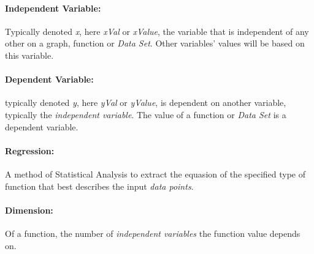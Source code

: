 \documentclass[main.tex]{subfiles}
\begin{document}
      \paragraph{Independent Variable:} Typically denoted \textit{x}, here \textit{xVal} or \textit{xValue}, the variable that is independent of any other on a graph, function or \textit{Data Set}. Other variables' values will be based on this variable.
      
      \paragraph{Dependent Variable:} typically denoted \textit{y}, here \textit{yVal} or \textit{\textit{yValue}}, is dependent on another variable, typically the \textit{independent variable}. The value of a function or \textit{Data Set} is a dependent variable.
      
      \paragraph{Regression:} A method of Statistical Analysis to extract the equasion of the specified type of function that best describes the input \textit{data points}.
      
      \paragraph{Dimension:} Of a function, the number of \textit{independent variables} the function value depends on.
\end{document}
